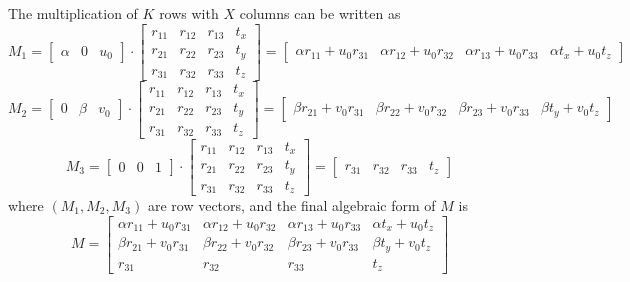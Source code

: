 \documentclass[12pt]{report}
\begin{document}
\begin{enumerate}
\begin{enumerate}
    The multiplication of $K$ rows with $X$ columns can be written as 
    $$
    M_1 = 
    \begin{bmatrix}
    \alpha & 0 & u_0
    \end{bmatrix}
    \cdot
    \begin{bmatrix}
    r_{11} & r_{12} & r_{13} & t_x \\
    r_{21} & r_{22} & r_{23} & t_y \\
    r_{31} & r_{32} & r_{33} & t_z
    \end{bmatrix}
    =
    \begin{bmatrix}
    \alpha r_{11} + u_0 r_{31} & \alpha r_{12} + u_0 r_{32} & \alpha r_{13} + u_0 r_{33} & \alpha t_x + u_0 t_z
    \end{bmatrix}
    $$
    $$
    M_2 = 
    \begin{bmatrix}
    0 & \beta & v_0
    \end{bmatrix}
    \cdot
    \begin{bmatrix}
    r_{11} & r_{12} & r_{13} & t_x \\
    r_{21} & r_{22} & r_{23} & t_y \\
    r_{31} & r_{32} & r_{33} & t_z
    \end{bmatrix}
    =
    \begin{bmatrix}
    \beta r_{21} + v_0 r_{31} & \beta r_{22} + v_0 r_{32} & \beta r_{23} + v_0 r_{33} & \beta t_y + v_0 t_z
    \end{bmatrix}
    $$
    $$
    M_3 = 
    \begin{bmatrix}
    0 & 0 & 1
    \end{bmatrix}
    \cdot
    \begin{bmatrix}
    r_{11} & r_{12} & r_{13} & t_x \\
    r_{21} & r_{22} & r_{23} & t_y \\
    r_{31} & r_{32} & r_{33} & t_z
    \end{bmatrix}
    =
    \begin{bmatrix}
    r_{31} & r_{32} & r_{33} & t_z
    \end{bmatrix}
    $$
    where $(M_1,M_2,M_3)$ are row vectors, and the final algebraic form of $M$ is 
    $$
    M = \begin{bmatrix}
    \alpha r_{11} + u_0 r_{31} & \alpha r_{12} + u_0 r_{32} & \alpha r_{13} + u_0 r_{33} & \alpha t_x + u_0 t_z \\
    \beta r_{21} + v_0 r_{31} & \beta r_{22} + v_0 r_{32} & \beta r_{23} + v_0 r_{33} & \beta t_y + v_0 t_z \\
    r_{31} & r_{32} & r_{33} & t_z
    \end{bmatrix}
    $$
    

\end{enumerate}
\end{enumerate}
\end{document}

